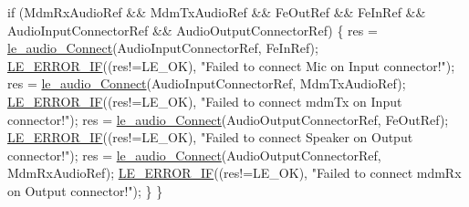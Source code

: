 \begin{DoxyCodeInclude}
    \textcolor{keywordflow}{if} (MdmRxAudioRef && MdmTxAudioRef && FeOutRef && FeInRef &&
        AudioInputConnectorRef && AudioOutputConnectorRef)
    \{
        res = \hyperlink{le__audio__interface_8h_a338df65b2fb1ae0140d86880adbcf0de}{le\_audio\_Connect}(AudioInputConnectorRef, FeInRef);
        \hyperlink{le__log_8h_aceaf11a11691d6c676e36dd317b38dbd}{LE\_ERROR\_IF}((res!=LE\_OK), \textcolor{stringliteral}{"Failed to connect Mic on Input connector!"});
        res = \hyperlink{le__audio__interface_8h_a338df65b2fb1ae0140d86880adbcf0de}{le\_audio\_Connect}(AudioInputConnectorRef, MdmTxAudioRef);
        \hyperlink{le__log_8h_aceaf11a11691d6c676e36dd317b38dbd}{LE\_ERROR\_IF}((res!=LE\_OK), \textcolor{stringliteral}{"Failed to connect mdmTx on Input connector!"});
        res = \hyperlink{le__audio__interface_8h_a338df65b2fb1ae0140d86880adbcf0de}{le\_audio\_Connect}(AudioOutputConnectorRef, FeOutRef);
        \hyperlink{le__log_8h_aceaf11a11691d6c676e36dd317b38dbd}{LE\_ERROR\_IF}((res!=LE\_OK), \textcolor{stringliteral}{"Failed to connect Speaker on Output connector!"});
        res = \hyperlink{le__audio__interface_8h_a338df65b2fb1ae0140d86880adbcf0de}{le\_audio\_Connect}(AudioOutputConnectorRef, MdmRxAudioRef);
        \hyperlink{le__log_8h_aceaf11a11691d6c676e36dd317b38dbd}{LE\_ERROR\_IF}((res!=LE\_OK), \textcolor{stringliteral}{"Failed to connect mdmRx on Output connector!"});
    \}
\}



\end{DoxyCodeInclude}

